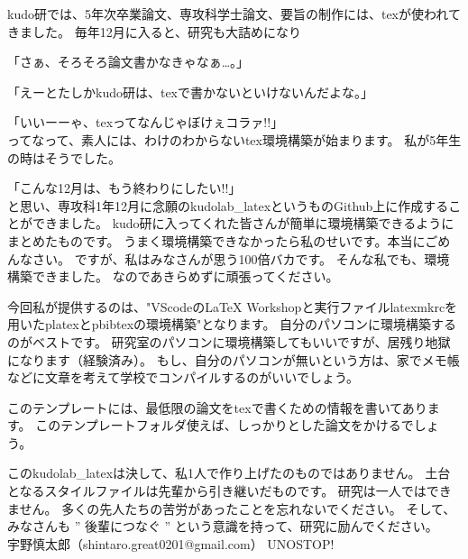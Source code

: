 \begin{jabstract}

    kudo研では、5年次卒業論文、専攻科学士論文、要旨の制作には、texが使われてきました。
    毎年12月に入ると、研究も大詰めになり
    
    「さぁ、そろそろ論文書かなきゃなぁ…。」

    「えーとたしかkudo研は、texで書かないといけないんだよな。」

    「いいーーゃ、texってなんじゃぼけぇコラァ!!」\\
    ってなって、素人には、わけのわからないtex環境構築が始まります。
    私が5年生の時はそうでした。
    
    「こんな12月は、もう終わりにしたい!!」\\
    と思い、専攻科1年12月に念願のkudolab\_latexというものGithub上に作成することができました。
    kudo研に入ってくれた皆さんが簡単に環境構築できるようにまとめたものです。
    うまく環境構築できなかったら私のせいです。本当にごめんなさい。
    ですが、私はみなさんが思う100倍バカです。
    そんな私でも、環境構築できました。
    なのであきらめずに頑張ってください。

    今回私が提供するのは、"VScodeのLaTeX Workshopと実行ファイルlatexmkrcを用いたplatexとpbibtexの環境構築"となります。
    自分のパソコンに環境構築するのがベストです。
    研究室のパソコンに環境構築してもいいですが、居残り地獄になります（経験済み）。
    もし、自分のパソコンが無いという方は、家でメモ帳などに文章を考えて学校でコンパイルするのがいいでしょう。

    このテンプレートには、最低限の論文をtexで書くための情報を書いてあります。
    このテンプレートフォルダ使えば、しっかりとした論文をかけるでしょう。

    このkudolab\_latexは決して、私1人で作り上げたのものではありません。
    土台となるスタイルファイルは先輩から引き継いだものです。
    研究は一人ではできません。
    多くの先人たちの苦労があったことを忘れないでください。
    そして、みなさんも ” 後輩につなぐ ” という意識を持って、研究に励んでください。\\

    宇野慎太郎（shintaro.great0201@gmail.com） UNOSTOP!
    
\end{jabstract}
